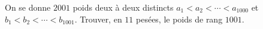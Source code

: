 On se donne $2001$ poids deux à deux distincts $a_1 < a_2 < \cdots < a_{1000}$ et $b_1 < b_2 < \cdots < b_{1001}$. Trouver, en $11$ pesées, le poids de rang $1001$.
